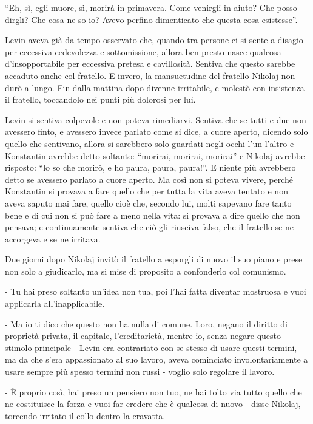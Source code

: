 ``Eh, sì, egli muore, sì, morirà in primavera. Come venirgli in aiuto? Che posso dirgli? Che cosa ne so io? Avevo perfino dimenticato che questa cosa esistesse''. 

\label{xxxii-2} 

Levin aveva già da tempo osservato che, quando tra persone ci si sente a disagio per eccessiva cedevolezza e sottomissione, allora ben presto nasce qualcosa d'insopportabile per eccessiva pretesa e cavillosità. Sentiva che questo sarebbe accaduto anche col fratello. E invero, la mansuetudine del fratello Nikolaj non durò a lungo. Fin dalla mattina dopo divenne irritabile, e molestò con insistenza il fratello, toccandolo nei punti più dolorosi per lui. 

Levin si sentiva colpevole e non poteva rimediarvi. Sentiva che se tutti e due non avessero finto, e avessero invece parlato come si dice, a cuore aperto, dicendo solo quello che sentivano, allora si sarebbero solo guardati negli occhi l'un l'altro e Konstantin avrebbe detto soltanto: ``morirai, morirai, morirai'' e Nikolaj avrebbe risposto: ``lo so che morirò, e ho paura, paura, paura!''. E niente più avrebbero detto se avessero parlato a cuore aperto. Ma così non si poteva vivere, perché Konstantin si provava a fare quello che per tutta la vita aveva tentato e non aveva saputo mai fare, quello cioè che, secondo lui, molti sapevano fare tanto bene e di cui non si può fare a meno nella vita: si provava a dire quello che non pensava; e continuamente sentiva che ciò gli riusciva falso, che il fratello se ne accorgeva e se ne irritava. 

Due giorni dopo Nikolaj invitò il fratello a esporgli di nuovo il suo piano e prese non solo a giudicarlo, ma si mise di proposito a confonderlo col comunismo. 

- Tu hai preso soltanto un'idea non tua, poi l'hai fatta diventar mostruosa e vuoi applicarla all'inapplicabile. 

- Ma io ti dico che questo non ha nulla di comune. Loro, negano il diritto di proprietà privata, il capitale, l'ereditarietà, mentre io, senza negare questo stimolo principale - Levin era contrariato con se stesso di usare questi termini, ma da che s'era appassionato al suo lavoro, aveva cominciato involontariamente a usare sempre più spesso termini non russi - voglio solo regolare il lavoro. 

- È proprio così, hai preso un pensiero non tuo, ne hai tolto via tutto quello che ne costituisce la forza e vuoi far credere che è qualcosa di nuovo - disse Nikolaj, torcendo irritato il collo dentro la cravatta. 

